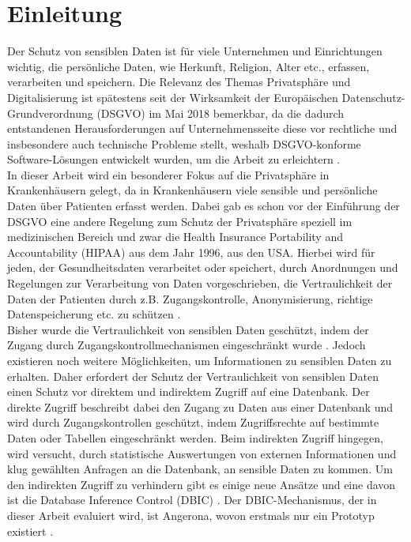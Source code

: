 \documentclass[german,version-2020-11]{uzl-thesis}
\begin{document}
\chapter{Einleitung}
Der Schutz von sensiblen Daten ist für viele Unternehmen und Einrichtungen wichtig, die persönliche Daten, wie Herkunft, Religion, Alter etc., erfassen, verarbeiten und speichern. Die Relevanz des Themas Privatsphäre und Digitalisierung ist spätestens seit der Wirksamkeit der Europäischen Datenschutz-Grundverordnung (DSGVO) \cite{1} im  Mai 2018 bemerkbar, da die dadurch entstandenen Herausforderungen auf Unternehmensseite diese vor rechtliche und insbesondere auch technische Probleme stellt, weshalb DSGVO-konforme Software-Lösungen entwickelt wurden, um die Arbeit zu erleichtern \cite{9}.\\ 
In dieser Arbeit wird ein besonderer Fokus auf die Privatsphäre in Krankenhäusern gelegt, da in Krankenhäusern viele sensible und persönliche Daten über Patienten erfasst werden. Dabei gab es schon vor der Einführung der DSGVO eine andere Regelung zum Schutz der Privatsphäre speziell im medizinischen Bereich und zwar die Health Insurance Portability and Accountability (HIPAA) aus dem Jahr 1996, aus den USA. Hierbei wird für jeden, der Gesundheitsdaten verarbeitet oder speichert, durch Anordnungen und Regelungen zur Verarbeitung von Daten vorgeschrieben, die Vertraulichkeit der Daten der Patienten durch z.B. Zugangskontrolle, Anonymisierung, richtige Datenspeicherung etc. zu schützen \cite{7}.\\
Bisher wurde die Vertraulichkeit von sensiblen Daten geschützt, indem der Zugang durch Zugangskontrollmechanismen eingeschränkt wurde \cite{2}. Jedoch existieren noch weitere Möglichkeiten, um Informationen zu sensiblen Daten zu erhalten. Daher erfordert der Schutz der Vertraulichkeit von sensiblen Daten einen Schutz vor direktem und indirektem Zugriff auf eine Datenbank. Der direkte Zugriff beschreibt dabei den Zugang zu Daten aus einer Datenbank und wird durch Zugangskontrollen geschützt, indem Zugriffsrechte auf bestimmte Daten oder Tabellen eingeschränkt werden. Beim indirekten Zugriff hingegen, wird versucht, durch statistische Auswertungen von externen Informationen und klug gewählten Anfragen an die Datenbank, an sensible Daten zu kommen. Um den indirekten Zugriff zu verhindern gibt es einige neue Ansätze und eine davon ist die Database Inference Control (DBIC) \cite{22}. Der DBIC-Mechanismus, der in dieser Arbeit evaluiert wird, ist Angerona, wovon erstmals nur ein Prototyp existiert \cite{guarnieri2017securing}. \\ 
\end{document}
